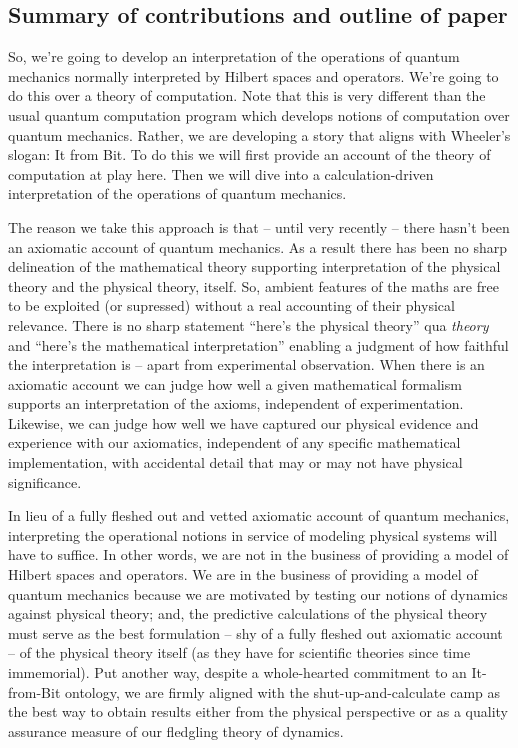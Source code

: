 \subsection{Summary of contributions and outline of paper}

So, we're going to develop an interpretation of the operations of
quantum mechanics normally interpreted by Hilbert spaces and
operators. We're going to do this over a theory of computation. Note
that this is very different than the usual quantum computation program
which develops notions of computation over quantum mechanics. Rather,
we are developing a story that aligns with Wheeler's slogan: It from
Bit. To do this we will first provide an account of the theory of
computation at play here. Then we will dive into a calculation-driven
interpretation of the operations of quantum mechanics.

The reason we take this approach is that -- until very recently --
there hasn't been an axiomatic account of quantum mechanics. As a
result there has been no sharp delineation of the mathematical theory
supporting interpretation of the physical theory and the physical
theory, itself. So, ambient features of the maths are free to be
exploited (or supressed) without a real accounting of their physical
relevance. There is no sharp statement ``here's the physical theory''
qua \emph{theory} and ``here's the mathematical interpretation''
enabling a judgment of how faithful the interpretation is -- apart
from experimental observation. When there is an axiomatic account we
can judge how well a given mathematical formalism supports an
interpretation of the axioms, independent of
experimentation. Likewise, we can judge how well we have captured our
physical evidence and experience with our axiomatics, independent of
any specific mathematical implementation, with accidental detail that
may or may not have physical significance. 

In lieu of a fully fleshed out and vetted axiomatic account of quantum
mechanics, interpreting the operational notions in service of modeling
physical systems will have to suffice. In other words, we are not in
the business of providing a model of Hilbert spaces and operators. We
are in the business of providing a model of quantum mechanics because
we are motivated by testing our notions of dynamics against physical
theory; and, the predictive calculations of the physical theory must
serve as the best formulation -- shy of a fully fleshed out axiomatic
account -- of the physical theory itself (as they have for scientific
theories since time immemorial). Put another way, despite a
whole-hearted commitment to an It-from-Bit ontology, we are firmly
aligned with the shut-up-and-calculate camp as the best way to obtain
results either from the physical perspective or as a quality assurance
measure of our fledgling theory of dynamics.

